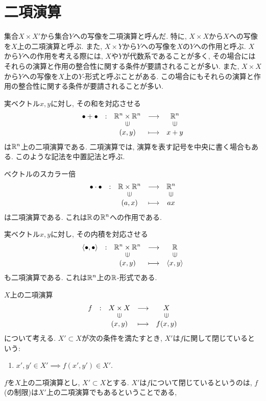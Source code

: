 \section{二項演算}
集合$X\times X'$から集合$Y$への写像を二項演算と呼んだ.
特に, $X\times X$から$X$への写像を$X$上の二項演算と呼ぶ.
また, $X\times Y$から$Y$への写像を$X$の$Y$への作用と呼ぶ.
$X$から$Y$への作用を考える際には,
$X$や$Y$が代数系であることが多く,
その場合にはそれらの演算と作用の整合性に関する条件が要請されることが多い.
また, $X\times X$から$Y$への写像を$X$上の$Y$-形式と呼ぶことがある.
この場合にもそれらの演算と作用の整合性に関する条件が要請されることが多い.

\begin{example}
  実ベクトル$x,y$に対し, その和を対応させる
  \begin{align*}
    \shazo{\bullet+\bullet}
          {\RR^n\times \RR^n}{\RR^n}
          {(x,y)}{x+y}
  \end{align*}
  は$\mathbb{R}^n$上の二項演算である.
  二項演算では, 演算を表す記号を中央に書く場合もある.
  このような記法を中置記法と呼ぶ.
\end{example}

\begin{example}
 ベクトルのスカラー倍
  \begin{align*}
    \shazo{\bullet \cdot \bullet}
          {\RR\times \RR^n}{\RR^n}
          {(a,x)}{ax}
  \end{align*}
  は二項演算である.
  これは$\mathbb{R}$の$\mathbb{R}^n$への作用である.
\end{example}

\begin{example}
  実ベクトル$x,y$に対し, その内積を対応させる
  \begin{align*}
    \shazo{\Braket{\bullet,\bullet}}
          {\RR^n\times \RR^n}{\RR}
          {(x,y)}{\Braket{x,y}}
  \end{align*}
  も二項演算である.
  これは$\mathbb{R}^n$上の$\mathbb{R}$-形式である.
\end{example}

\begin{definition}
  $X$上の二項演算
  \begin{align*}
    \shazo{f}
          {X\times X}{X}
          {(x,y)}{f(x,y)}
  \end{align*}
  について考える.
  $X'\subset X$が次の条件を満たすとき,
  $X'$は$f$に関して閉じているという:
  \begin{enumerate}
  \item $x',y'\in X'\implies f(x',y')\in X'$.
  \end{enumerate}
\end{definition}
\begin{remark}
  $f$を$X$上の二項演算とし,
  $X'\subset X$とする.
  $X'$は$f$について閉じているというのは,
  $f$(の制限)は$X'$上の二項演算でもあるということである,
\end{remark}



